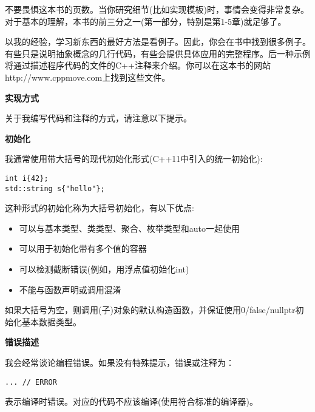 不要畏惧这本书的页数。当你研究细节(比如实现模板)时，事情会变得非常复杂。对于基本的理解，本书的前三分之一(第一部分，特别是第1-5章)就足够了。\par

以我的经验，学习新东西的最好方法是看例子。因此，你会在书中找到很多例子。有些只是说明抽象概念的几行代码，有些会提供具体应用的完整程序。后一种示例将通过描述程序代码的文件的C++注释来介绍。你可以在这本书的网站http://www.cppmove.com上找到这些文件。\par

\hspace*{\fill} \par %
\textbf{实现方式}

关于我编写代码和注释的方式，请注意以下提示。\par

\hspace*{\fill} \par %
\textbf{初始化}

我通常使用带大括号的现代初始化形式(C++11中引入的统一初始化):\par
\begin{lstlisting}[caption={}]
int i{42};
std::string s{"hello"};
\end{lstlisting}

这种形式的初始化称为大括号初始化，有以下优点:\par
\begin{itemize}
	\item 可以与基本类型、类类型、聚合、枚举类型和auto一起使用
	\item 可以用于初始化带有多个值的容器
	\item 可以检测截断错误(例如，用浮点值初始化int)
	\item 不能与函数声明或调用混淆
\end{itemize}

如果大括号为空，则调用(子)对象的默认构造函数，并保证使用0/false/nullptr初始化基本数据类型。\par

\hspace*{\fill} \par %
\textbf{错误描述}

我会经常谈论编程错误。如果没有特殊提示，错误或注释为：\par

\begin{lstlisting}[caption={}]
... // ERROR
\end{lstlisting}

\hspace*{\fill} \par %
表示编译时错误。对应的代码不应该编译(使用符合标准的编译器)。\par


